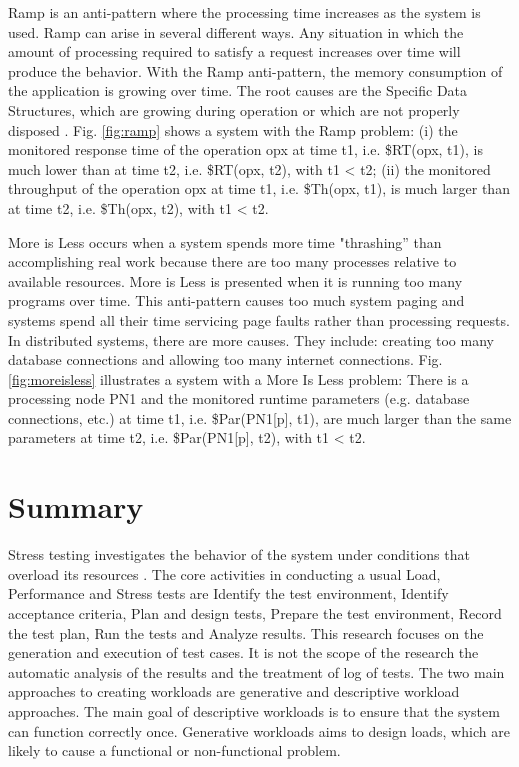 \documentclass[espaco=umemeio,chapter=TITLE,twoside,openright]{abnt}
\begin{document}
Ramp is an anti-pattern where the processing time increases as the system is used. Ramp can arise in several different ways. Any situation in which the amount of processing required to satisfy a request increases over time will produce the behavior. With the Ramp anti-pattern, the memory consumption of the application is growing over time. The root causes are the Specific Data Structures, which are growing during operation or which are not properly disposed \cite{Wert2014} \cite{Smith2003}. Fig. \ref{fig:ramp} shows a system  with the Ramp problem:  (i) the monitored response time of the operation opx at time t1, i.e. \$RT(opx, t1), is much lower than at time t2, i.e. \$RT(opx, t2), with t1 < t2; (ii) the monitored throughput of the operation opx at time t1, i.e. \$Th(opx, t1), is much larger than at time t2, i.e. \$Th(opx, t2), with t1 < t2.

More is Less occurs when a system spends more time "thrashing” than accomplishing real work because there are too many processes relative to available resources. More is Less is presented when it is running too many programs over time. This anti-pattern causes too much system paging and systems spend all their time servicing page faults rather than processing requests. In distributed systems, there are more causes. They include: creating too many database connections and  allowing too many internet connections. Fig. \ref{fig:moreisless} illustrates a system  with a More Is Less problem: There is a processing node PN1 and the monitored runtime parameters (e.g. database connections, etc.) at time t1, i.e. \$Par(PN1[p], t1), are much larger than the same parameters at time t2, i.e. \$Par(PN1[p], t2), with t1 < t2.

\section{Summary}

Stress testing investigates the behavior of the system under conditions
that overload its resources \cite{Sandler2004} \cite{Lewis2005}. The core activities in conducting a usual Load, Performance and Stress tests are  Identify the test environment, Identify acceptance criteria, Plan and design tests, Prepare the test environment, Record the test plan, Run the tests and Analyze results. This research focuses on the generation and execution of test cases. It is not the scope of the research the automatic analysis of the results and the treatment of log of tests. The two main approaches to creating workloads are generative and descriptive workload approaches. The main goal of descriptive workloads is to ensure that the system can function correctly once. Generative workloads  aims to design loads, which are likely to cause a functional or non-functional problem. 
\end{document}
